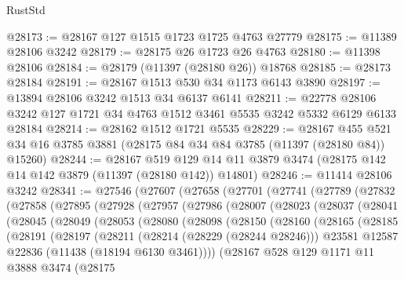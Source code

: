 \begin{lexlean}{RustStd}
\begin{coremodule}
@28173 := @28167 @127 @1515 @1723 @1725 @4763 @27779
@28175 := @11389 @28106 @3242
@28179 := @28175 @26 @1723 @26 @4763
@28180 := @11398 @28106
@28184 := @28179 (@11397 (@28180 @26)) @18768
@28185 := @28173 @28184
@28191 := @28167 @1513 @530 @34 @1173 @6143 @3890
@28197 := @13894 @28106 @3242 @1513 @34 @6137 @6141
@28211 := @22778 @28106 @3242 @127 @1721 @34 @4763 @1512 @3461 @5535 @3242 @5332 @6129 @6133 @28184
@28214 := @28162 @1512 @1721 @5535
@28229 := @28167
    @455
    @521
    @34
    @16
    @3785
    @3881
    (@28175 @84 @34 @84 @3785 (@11397 (@28180 @84)) @15260)
@28244 := @28167
    @519
    @129
    @14
    @11
    @3879
    @3474
    (@28175 @142 @14 @142 @3879 (@11397 (@28180 @142)) @14801)
@28246 := @11414 @28106 @3242
@28341 := @27546
    (@27607
      (@27658
        (@27701
          (@27741
            (@27789
              (@27832
                (@27858
                  (@27895
                    (@27928
                      (@27957
                        (@27986
                          (@28007
                            (@28023
                              (@28037
                                (@28041
                                  (@28045
                                    (@28049
                                      (@28053
                                        (@28080
                                          (@28098
                                            (@28150
                                              (@28160
                                                (@28165
                                                  (@28185
                                                    (@28191
                                                      (@28197
                                                        (@28211
                                                          (@28214 (@28229 (@28244 @28246)))
                                                          @23581
                                                          @12587
                                                          @22836
                                                          (@11438 (@18194 @6130 @3461))))
                                                      (@28167
                                                        @528
                                                        @129
                                                        @1171
                                                        @11
                                                        @3888
                                                        @3474
                                                        (@28175

\end{coremodule}
\end{lexlean}
